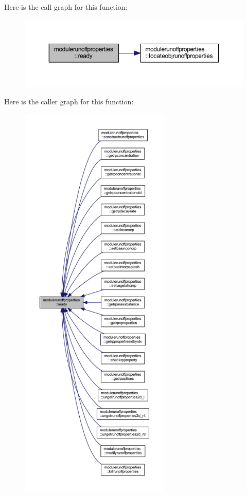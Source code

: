 Here is the call graph for this function\+:\nopagebreak
\begin{figure}[H]
\begin{center}
\leavevmode
\includegraphics[width=350pt]{namespacemodulerunoffproperties_a8d87a5f2a053e30ef829a92665e19d06_cgraph}
\end{center}
\end{figure}
Here is the caller graph for this function\+:\nopagebreak
\begin{figure}[H]
\begin{center}
\leavevmode
\includegraphics[height=550pt]{namespacemodulerunoffproperties_a8d87a5f2a053e30ef829a92665e19d06_icgraph}
\end{center}
\end{figure}
\mbox{\label{namespacemodulerunoffproperties_a0582858e9347f67d92588e44257918a3}} 
